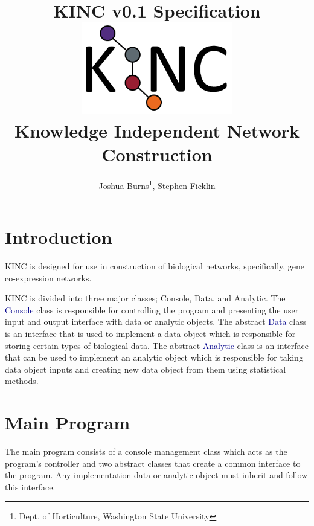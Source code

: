 \documentclass[10pt]{article}
\providecommand{\h}[1]{\textcolor{darkblue}{#1}}
\begin{document}
\title{\textbf{KINC v0.1 Specification}\\
\vspace{1mm}
\includegraphics[width=8cm,height=4cm]{KINClogo.png}
\\Knowledge Independent Network Construction}
\author{Joshua Burns\thanks{Dept. of Horticulture, Washington State 
University}, Stephen Ficklin\footnotemark[1]}
\maketitle

\newpage
\tableofcontents

\newpage
\section{Introduction}

KINC is designed for use in construction of biological networks, specifically, 
gene co-expression networks.

KINC is divided into three major classes; Console, Data, and Analytic. The 
\h{Console} 
class is responsible for controlling the program and presenting the user input 
and output interface with data or analytic objects. The abstract \h{Data} class 
is an interface that is used to implement a data object which is responsible 
for storing certain types of biological data. The abstract \h{Analytic} class is 
an interface that can be used to implement an analytic object which is 
responsible for taking data object inputs and creating new data object from 
them using statistical methods.

\newpage
\section{Main Program}

The main program consists of a console management class which acts as the 
program's controller and two abstract classes that create a common 
interface to the program. Any implementation data or analytic object must 
inherit and follow this interface.
\end{document}
